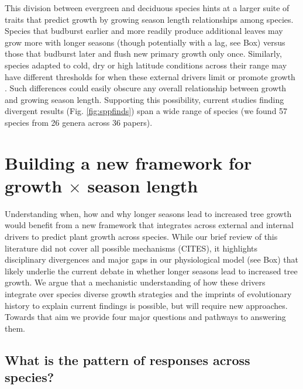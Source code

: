 \documentclass[11pt]{article}
\newcommand{\R}[1]{\label{#1}\linelabel{#1}}
\begin{document}
This division between evergreen and deciduous species hints at a larger suite of traits that predict growth by growing season length relationships among species. Species that budburst earlier and more readily produce additional leaves \citep[e.g. leaf flushes after budset, and other characteristics more common to `indeterminate' species,][]{kikuzawa1982leaf,Lechowicz:1984cr} may grow more with longer seasons (though potentially with a lag, see Box) versus those that budburst later and flush new primary growth only once. Similarly, species adapted to cold, dry or high latitude conditions across their range may have different thresholds for when these external drivers limit or promote growth \citep[e.g. some \emph{Populus} and \emph{Quercus} species,][and see Fig.\ref{fig:moraconcept}]{soolanayakanahally2013timing,mckown2016impacts,delpierre2017tree,de2022temperature}. Such differences could easily obscure any overall relationship between growth and growing season length. Supporting this possibility, current studies finding divergent results (Fig. \ref{fig:sppfinds}) span a wide range of species (we found  57 species from 26 genera across 36 papers). 

\section*{Building a new framework for growth $\times$ season length} %

Understanding when, how and why longer seasons lead to increased tree growth would benefit from a new framework that integrates across external and internal drivers to predict plant growth across species. While our brief review of this literature did not cover all possible mechanisms (CITES), it highlights disciplinary divergences and major gaps in our physiological model (see Box) \R{forbigKref1}\R{morebox} that likely underlie the current debate in whether longer seasons lead to increased tree growth. We argue that a mechanistic understanding of how these drivers integrate over species diverse growth strategies and the imprints of evolutionary history to explain current findings is possible, but will require new approaches. Towards that aim we provide four major questions and pathways to answering them. 

\subsection*{What is the pattern of responses across species?}  %
\end{document}

